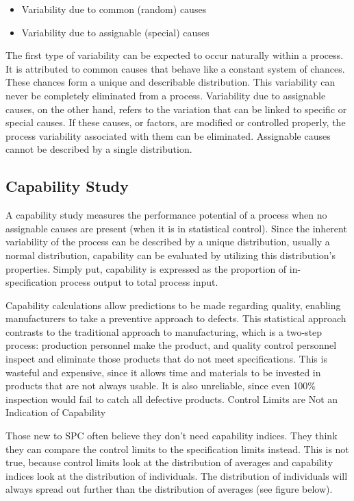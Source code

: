 \documentclass[MASTER-SPC.tex]{subfiles}
\begin{document}
\begin{itemize}
	\item Variability due to common (random) causes
	\item Variability due to assignable (special) causes
\end{itemize}
The first type of variability can be expected to occur naturally within a process. It is attributed to common causes that behave like a constant system of chances. These chances form a unique and describable distribution. This variability can never be completely eliminated from a process. Variability due to assignable causes, on the other hand, refers to the variation that can be linked to specific or special causes. If these causes, or factors, are modified or controlled properly, the process variability associated with them can be eliminated. Assignable causes cannot be described by a single distribution.
\subsection{Capability Study} 
A capability study measures the performance potential of a process when no assignable causes are present (when it is in statistical control). Since the inherent variability of the process can be described by a unique distribution, usually a normal distribution, capability can be evaluated by utilizing this distribution’s properties. Simply put, capability is expressed as the proportion of in-specification process output to total process input.

Capability calculations allow predictions to be made regarding quality, enabling manufacturers to take a preventive approach to defects. This statistical approach contrasts to the traditional approach to manufacturing, which is a two-step process: production personnel make the product, and quality control personnel inspect and eliminate those products that do not meet specifications. This is wasteful and expensive, since it allows time and materials to be invested in products that are not always usable. It is also unreliable, since even 100\% inspection would fail to catch all defective products.
Control Limits are Not an Indication of Capability

Those new to SPC often believe they don’t need capability indices. They think they can compare the control limits to the specification limits instead. This is not true, because control limits look at the distribution of averages and capability indices look at the distribution of individuals. The distribution of individuals will always spread out further than the distribution of averages (see figure below). 
\end{document}

